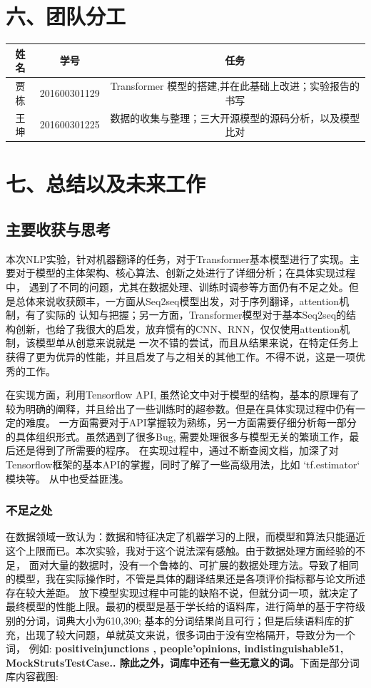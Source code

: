 \documentclass[UTF8,a4paper,10pt]{ctexart}
\begin{document}
\setcounter{section}{6}
\section*{六、团队分工}

\begin{tabular}{ccc}
  \hline
  姓名& 学号& 任务\\
  \hline
  贾栋&201600301129 &Transformer 模型的搭建,并在此基础上改进；实验报告的书写\\
  王坤&201600301225 &数据的收集与整理；三大开源模型的源码分析，以及模型比对\\
  \hline
\end{tabular}

\setcounter{section}{7}
\section*{七、总结以及未来工作}

\setcounter{subsection}{0}
\subsection{主要收获与思考}
  本次NLP实验，针对机器翻译的任务，对于Transformer基本模型进行了实现。主要对于模型的主体架构、核心算法、创新之处进行了详细分析；在具体实现过程中，
  遇到了不同的问题，尤其在数据处理、训练时调参等方面仍有不足之处。但是总体来说收获颇丰，一方面从Seq2seq模型出发，对于序列翻译，attention机制，有了实际的
  认知与把握；另一方面，Transformer模型对于基本Seq2seq的结构创新，也给了我很大的启发，放弃惯有的CNN、RNN，仅仅使用attention机制，该模型单从创意来说就是
  一次不错的尝试，而且从结果来说，在特定任务上获得了更为优异的性能，并且启发了与之相关的其他工作。不得不说，这是一项优秀的工作。

  在实现方面，利用Tensorflow API, 虽然论文中对于模型的结构，基本的原理有了较为明确的阐释，并且给出了一些训练时的超参数。但是在具体实现过程中仍有一定的难度。
  一方面需要对于API掌握较为熟练，另一方面需要仔细分析每一部分的具体组织形式。虽然遇到了很多Bug, 需要处理很多与模型无关的繁琐工作，最后还是得到了所需要的程序。
  在实现过程中，通过不断查阅文档，加深了对Tensorflow框架的基本API的掌握，同时了解了一些高级用法，比如 \textmd{`tf.estimator`} 模块等。
  从中也受益匪浅。

\subsubsection{不足之处}
在数据领域一致认为：数据和特征决定了机器学习的上限，而模型和算法只能逼近这个上限而已。本次实验，我对于这个说法深有感触。由于数据处理方面经验的不足，
面对大量的数据时，没有一个鲁棒的、可扩展的数据处理方法。导致了相同的模型，我在实际操作时，不管是具体的翻译结果还是各项评价指标都与论文所述存在较大差距。
放下模型实现过程中可能的缺陷不说，但就分词一项，就决定了最终模型的性能上限。最初的模型是基于学长给的语料库，进行简单的基于字符级别的分词，词典大小为610,390;
基本的分词结果尚且可行；但是后续语料库的扩充，出现了较大问题，单就英文来说，很多词由于没有空格隔开，导致分为一个词， 例如: \textbf{positiveinjunctions
, people'opinions, indistinguishable51, MockStrutsTestCase.. 除此之外，词库中还有一些无意义的词。}下面是部分词库内容截图:
\end{document}
